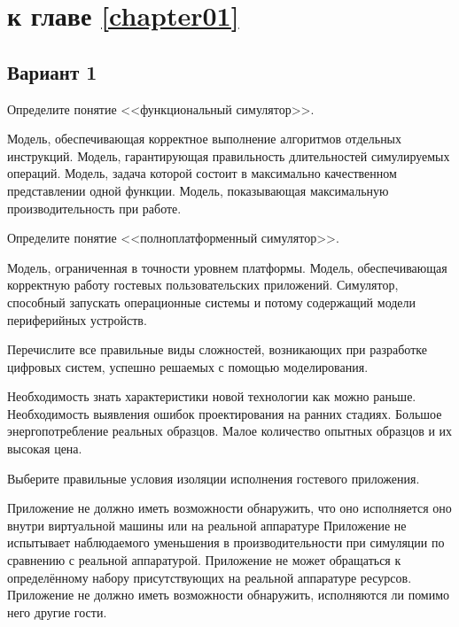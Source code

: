\section{\Questions к главе \ref{chapter01}} %



\subsection*{Вариант 1}

\begin{questions}

\question[5] Определите понятие <<функциональный симулятор>>.
\begin{choices}
\correctchoice Модель, обеспечивающая корректное выполнение алгоритмов отдельных инструкций.
\choice Модель, гарантирующая правильность длительностей симулируемых операций.
\choice Модель, задача которой состоит в максимально качественном представлении одной функции.
\choice Модель, показывающая максимальную производительность при работе.
\end{choices}

\question[5] Определите понятие <<полноплатформенный симулятор>>.
\begin{choices}
\choice Модель, ограниченная в точности уровнем платформы.
\choice Модель, обеспечивающая корректную работу гостевых пользовательских приложений.
\correctchoice Симулятор, способный запускать операционные системы и потому содержащий модели периферийных устройств.
\end{choices}

\question[3] Перечислите все правильные виды сложностей, возникающих при разработке цифровых систем, успешно решаемых с помощью моделирования.
\begin{choices}
\correctchoice Необходимость знать характеристики новой технологии как можно раньше.
\correctchoice Необходимость выявления ошибок проектирования на ранних стадиях.
\choice Большое энергопотребление реальных образцов.
\correctchoice Малое количество опытных образцов и их высокая цена.
\end{choices}

\question[3] Выберите правильные условия изоляции исполнения гостевого приложения.
\begin{choices}
\correctchoice Приложение не должно иметь возможности обнаружить, что оно исполняется оно внутри виртуальной машины или на реальной аппаратуре
\choice Приложение не испытывает наблюдаемого уменьшения в производительности при симуляции по сравнению с реальной аппаратурой.
\choice Приложение не может обращаться к определённому набору присутствующих на реальной аппаратуре ресурсов.
\correctchoice Приложение не должно иметь возможности обнаружить, исполняются ли помимо него другие гости.
\end{choices}


\end{questions}
